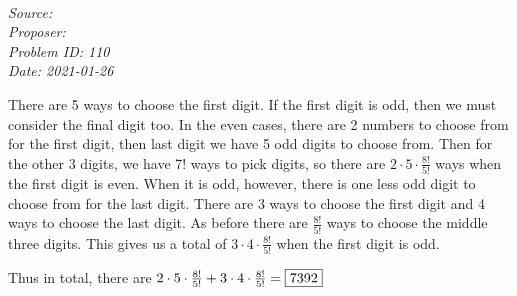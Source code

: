   \SSbreak\\
\emph{Source: \Cfolk}\\
\emph{Proposer: \Pkiesh}\\ %
\emph{Problem ID: 110}\\
\emph{Date: 2021-01-26}\\
\SSbreak

\bigskip

\begin{solution}\hfil\medskip

There are 5 ways to choose the first digit. If the first digit is odd, then we must consider the final digit too. In the even cases, there are 2 numbers to choose from for the first digit, then last digit we have 5 odd digits to choose from. Then for the other 3 digits, we have 7! ways to pick digits, so there are \(2\cdot5\cdot\frac{8!}{5!}\) ways when the first digit is even. When it is odd, however, there is one less odd digit to choose from for the last digit. There are 3 ways to choose the first digit and 4 ways to choose the last digit. As before there are \(\frac{8!}{5!}\) ways to choose the middle three digits. This gives us a total of \(3\cdot4\cdot\frac{8!}{5!}\) when the first digit is odd.

Thus in total, there are \(2\cdot5\cdot\frac{8!}{5!}+3\cdot4\cdot\frac{8!}{5!}=\fbox{7392}\)
\end{solution}\bigskip
